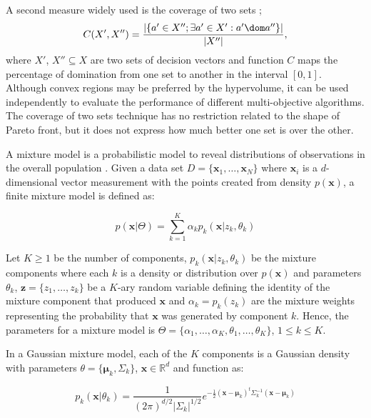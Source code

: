 \documentclass{llncs}
\renewcommand{\vec}[1]{\mathbf{#1}}
\begin{document}
A second measure widely used is the coverage of two sets \cite{zitzler1999multiobjective};
\begin{equation}
 C(X', X'')=\frac{|\{a' \in X'';\exists a' \in X': a' \dom a''\}|}{|X''|},
\end{equation}
where $X'$, $X'' \subseteq X$ are two sets of decision vectors and function $C$ maps the percentage of domination from one set to another in the interval $[0,1]$. Although convex regions may be preferred by the hypervolume, it can be used independently to evaluate the performance of different multi-objective algorithms. The coverage of two sets technique has no restriction related to the shape of Pareto front, but it does not express how much better one set is over the other.


\marginpar{\textcolor{blue}{Mixture Model}}
A mixture model is a probabilistic model to reveal distributions of observations in the overall population \cite{Padhraic,barber2012bayesian}. Given a data set $D=\{\vec{x}_1,\ldots,\vec{x}_N\}$ where $\vec{x}_i$ is a $d$-dimensional vector measurement with the points created from density $p(\vec{x})$, a finite mixture model is defined as:

\begin{equation}\label{eqn:mix1}
 p\left( \vec{x}|\Theta\right)=\sum\limits_{k=1}^{K}\alpha_kp_k\left(  \vec{x}|z_k,\theta_k \right) 
\end{equation} 

Let $K\geq1$ be the number of components, $p_k\left(  \vec{x}|z_k,\theta_k \right)$ be the mixture components where each $k$ is a density or distribution over $p\left(\vec{x}\right)$ and parameters $\theta_k$, $\vec{z}=\{z_1,\ldots,z_k\}$ be a $K$-ary random variable defining the identity of the mixture component that produced $\vec{x}$ and $\alpha_k=p_k\left(  z_k \right)$ are the mixture weights representing the probability that $\vec{x}$ was generated by component $k$. Hence, the parameters for a mixture model is $\Theta = \{ \alpha_1,\ldots,\alpha_K,\theta_1,\ldots,\theta_K\}$, $1\leq k \leq K$.

In a Gaussian mixture model, each of the $K$ components is a Gaussian density with parameters $\theta=\{\vec{\mu}_k,\Sigma_k\}$, $\vec{x} \in \mathbb{R}^d$ and function as:

\begin{equation}\label{eqn:gaussian1}
p_k\left( \vec{x}|\theta_k\right) = \frac{1}{ \left(2\pi\right)^{d/2} |\Sigma_k|^{1/2}}e^{-\frac{1}{2}\left( \vec{x} - \vec{\mu}_k\right)^t \Sigma^{-1}_k\left(\vec{x}-\vec{\mu}_k\right)}
\end{equation} 
\end{document}

